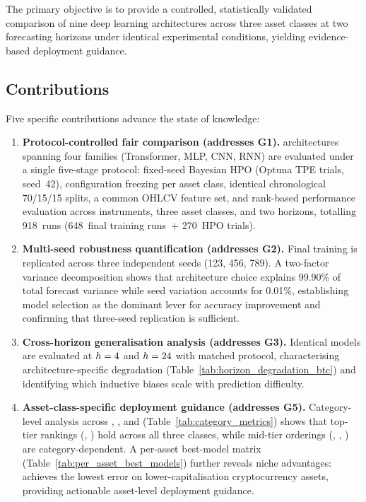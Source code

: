 The primary objective is to provide a controlled, statistically validated comparison of nine deep learning architectures across three asset classes at two forecasting horizons under identical experimental conditions, yielding evidence-based deployment guidance.

\subsection{Contributions}
\label{sec:contributions}

Five specific contributions advance the state of knowledge:

\begin{enumerate}[label=\textbf{C\arabic*.}]
  \item \textbf{Protocol-controlled fair comparison (addresses G1).}  \Nmodels architectures spanning four families (Transformer, MLP, CNN, RNN) are evaluated under a single five-stage protocol: fixed-seed Bayesian HPO (\ntrials Optuna TPE trials, seed~42), configuration freezing per asset class, identical chronological 70/15/15 splits, a common OHLCV feature set, and rank-based performance evaluation across \nassets instruments, three asset classes, and two horizons, totalling 918~runs (648~final training runs~$+$ 270~HPO trials).

  \item \textbf{Multi-seed robustness quantification (addresses G2).}  Final training is replicated across three independent seeds (123, 456, 789).  A two-factor variance decomposition shows that architecture choice explains 99.90\% of total forecast variance while seed variation accounts for 0.01\%, establishing model selection as the dominant lever for accuracy improvement and confirming that three-seed replication is sufficient.

  \item \textbf{Cross-horizon generalisation analysis (addresses G3).}  Identical models are evaluated at $h=4$ and $h=24$ with matched protocol, characterising architecture-specific degradation (Table~\ref{tab:horizon_degradation_btc}) and identifying which inductive biases scale with prediction difficulty.

  \item \textbf{Asset-class-specific deployment guidance (addresses G5).}  Category-level analysis across \crypto, \forex, and \indices (Table~\ref{tab:category_metrics}) shows that top-tier rankings (\moderntcn, \patchtst) hold across all three classes, while mid-tier orderings (\dlinear, \nhits, \timexer) are category-dependent.  A per-asset best-model matrix (Table~\ref{tab:per_asset_best_models}) further reveals niche advantages: \nhits achieves the lowest error on lower-capitalisation cryptocurrency assets, providing actionable asset-level deployment guidance.


\end{enumerate}
